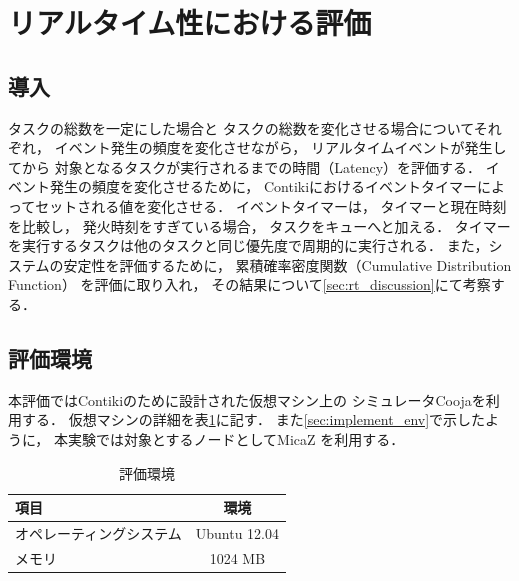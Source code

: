 \section{リアルタイム性における評価}
\subsection{導入}
タスクの総数を一定にした場合と
タスクの総数を変化させる場合についてそれぞれ，
イベント発生の頻度を変化させながら，
リアルタイムイベントが発生してから
対象となるタスクが実行されるまでの時間（Latency）を評価する．
イベント発生の頻度を変化させるために，
Contikiにおけるイベントタイマーによってセットされる値を変化させる．
イベントタイマーは，
タイマーと現在時刻を比較し，
発火時刻をすぎている場合，
タスクをキューへと加える．
タイマーを実行するタスクは他のタスクと同じ優先度で周期的に実行される．
また，システムの安定性を評価するために，
累積確率密度関数（Cumulative Distribution Function）
を評価に取り入れ，
その結果について\ref{sec:rt_discussion}にて考察する．



\subsection{評価環境}
本評価ではContikiのために設計された仮想マシン上の
シミュレータCooja\cite{osterlind2006cross}を利用する．
仮想マシンの詳細を表\ref{tab:instant_contiki}に記す．
また\ref{sec:implement_env}で示したように，
本実験では対象とするノードとしてMicaZ\cite{Hill:2002:MWP:623308.624560}
を利用する．

\begin{table}[htbp]
  \centering
  \caption{評価環境}
  \begin{tabular}{|l||c|} \hline
  	項目	 & 環境 \\ \hline \hline
	オペレーティングシステム & Ubuntu 12.04 \\ \hline
	メモリ & 1024 MB \\ \hline
  \end{tabular}
  \label{tab:instant_contiki}
\end{table}






